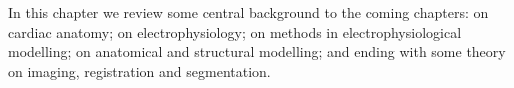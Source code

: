 In this chapter we review some central background to the coming chapters: on cardiac anatomy; on electrophysiology; on methods in electrophysiological modelling; on anatomical and structural modelling; and ending with some theory on imaging, registration and segmentation.
